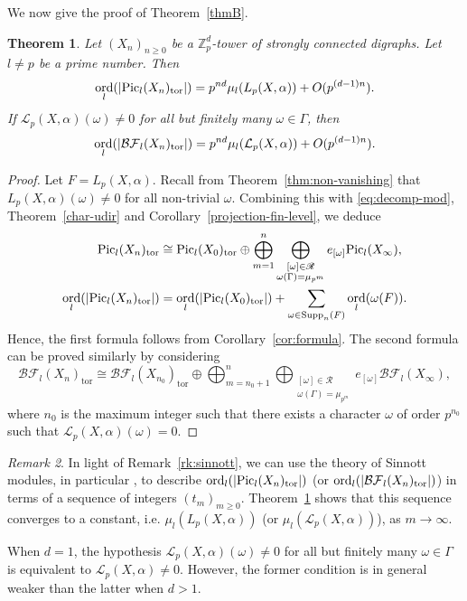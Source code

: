 \documentclass[11pt]{amsart}
\DeclareMathOperator{\ord}{ord}
\newtheorem{theorem}{Theorem}[section]
\numberwithin{equation}{section}
\theoremstyle{remark}
\newtheorem{remark}[theorem]{Remark}
\newcommand{\Supp}{\mathrm{Supp}}
\newcommand{\?}{\stackrel{?}{=}}
\newcommand{\cL}{\mathcal{L}}
\newcommand{\Zp}{\mathbb{Z}_p}
\newcommand{\Pic}{\textup{Pic}}
\newcommand{\BF}{\mathcal{BF}}
\newcommand{\sR}{\mathscr{R}}
\begin{document}
We now give the proof of Theorem~\ref{thmB}.

\begin{theorem}\label{thm:generalizedSinnott}
    Let $(X_n)_{n\ge0}$ be a $\Zp^d$-tower of strongly connected digraphs.  Let $l\ne p$ be a prime number. Then 
    \[
    \ord_l(|\Pic_l(X_n)_\mathrm{tor}|)=p^{nd}\mu_l(L_p(X,\alpha))+O(p^{(d-1)n}).
    \] If $\mathcal{L}_p(X,\alpha)(\omega)\neq 0$ for all but finitely many $\omega\in\Gamma$, then
    \[\ord_l(\vert \BF_l(X_n)_{\textup{tor}}\vert)=p^{nd}\mu_l(\mathcal{L}_p(X,\alpha))+O(p^{(d-1)n}).\]
\end{theorem}
\begin{proof}
Let $F=L_p(X,\alpha)$. Recall from Theorem~\ref{thm:non-vanishing} that $L_p(X,\alpha)(\omega)\ne0$ for all non-trivial $\omega$. Combining this with \eqref{eq:decomp-mod}, Theorem~\ref{char-udir} and Corollary~\ref{projection-fin-level}, we deduce
\begin{align*}
\Pic_l(X_n)_\mathrm{tor}&\cong\Pic_l(X_0)_\mathrm{tor}\oplus\bigoplus_{m=1}^n\bigoplus_{\substack{[\omega]\in\sR\\\omega(\Gamma)=\mu_{p^m}}}e_{[\omega]}\Pic_l(X_\infty),\\
\ord_l(|\Pic_l(X_n)_\mathrm{tor}|)&= \ord_l(|\Pic_l(X_0)_\mathrm{tor}|)+\sum_{\omega\in\Supp_n(F)}\ord_l(\omega(F)).
\end{align*}
Hence, the first formula follows from Corollary~\ref{cor:formula}. The second formula can be proved similarly by considering
\[
\BF_l(X_n)_\mathrm{tor}\cong\BF_l(X_{n_0})_\mathrm{tor}\oplus\bigoplus_{m=n_0+1}^n\bigoplus_{\substack{[\omega]\in\sR\\\omega(\Gamma)=\mu_{p^m}}}e_{[\omega]}\BF_l(X_\infty),
\]
where $n_0$ is the maximum integer such that there exists a character $\omega$ of order $p^{n_0}$ such that $\cL_p(X,\alpha)(\omega)=0$.
\end{proof}


\begin{remark}\label{rk:comparesinnott}
In light of Remark~\ref{rk:sinnott}, we can use the theory of Sinnott modules, in particular \cite[Theorem~4.7]{BandiniLonghi}, to describe $\ord_l(|\Pic_l(X_n)_\mathrm{tor}|)$ (or $\ord_l(\vert \BF_l(X_n)_{\textup{tor}}\vert)$) in terms of a sequence of integers $(t_m)_{m\ge0}$. Theorem~\ref{thm:generalizedSinnott} shows that this sequence converges to a constant, i.e. $\mu_l(L_p(X,\alpha))$ (or $\mu_l(\cL_p(X,\alpha))$), as $m\to\infty$.

When $d=1$, the hypothesis $\mathcal{L}_p(X,\alpha)(\omega)\neq 0$ for all but finitely many $\omega\in\Gamma$ is equivalent to $\cL_p(X,\alpha)\ne0$. However, the former condition is in general weaker than the latter when $d>1$.

\end{remark}
\end{document}
